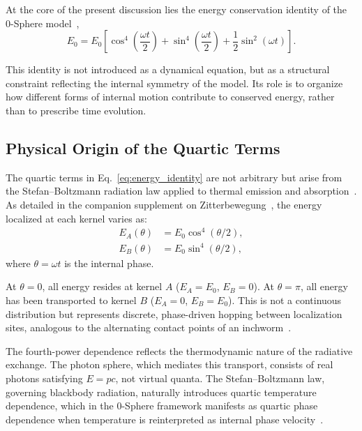 \documentclass[12pt,letterpaper]{article}
\begin{document}
At the core of the present discussion lies the energy conservation identity of the 0-Sphere model~\cite{hanamura16759284,hanamura17765017},
\begin{equation}
E_0 = E_0 \left[
\cos^4\!\left(\frac{\omega t}{2}\right)
+ \sin^4\!\left(\frac{\omega t}{2}\right)
+ \frac{1}{2}\sin^2(\omega t)
\right].
\label{eq:energy_identity}
\end{equation}

This identity is not introduced as a dynamical equation, but as a structural constraint reflecting the internal symmetry of the model. Its role is to organize how different forms of internal motion contribute to conserved energy, rather than to prescribe time evolution.

\subsection{Physical Origin of the Quartic Terms}

The quartic terms in Eq.~\eqref{eq:energy_identity} are not arbitrary but arise from the Stefan--Boltzmann radiation law applied to thermal emission and absorption~\cite{hanamura16759284}. As detailed in the companion supplement on Zitterbewegung~\cite{hanamura18356895}, the energy localized at each kernel varies as:
\begin{align}
E_A(\theta) &= E_0 \cos^4(\theta/2), \\
E_B(\theta) &= E_0 \sin^4(\theta/2),
\end{align}
where $\theta = \omega t$ is the internal phase.

At $\theta = 0$, all energy resides at kernel $A$ ($E_A = E_0$, $E_B = 0$). At $\theta = \pi$, all energy has been transported to kernel $B$ ($E_A = 0$, $E_B = E_0$). This is not a continuous distribution but represents discrete, phase-driven hopping between localization sites, analogous to the alternating contact points of an inchworm~\cite{hanamura18511664}.

The fourth-power dependence reflects the thermodynamic nature of the radiative exchange. The photon sphere, which mediates this transport, consists of real photons satisfying $E = pc$, not virtual quanta. The Stefan--Boltzmann law, governing blackbody radiation, naturally introduces quartic temperature dependence, which in the 0-Sphere framework manifests as quartic phase dependence when temperature is reinterpreted as internal phase velocity~\cite{hanamura16759284}.
\end{document}
